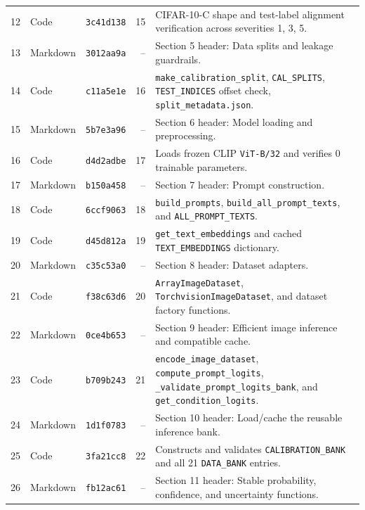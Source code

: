 \documentclass[11pt,a4paper]{article}
\begin{document}
\begin{small}
\begin{longtable}{r l l r L{0.50\textwidth}}
12 & Code & \texttt{3c41d138} & 15 & CIFAR-10-C shape and test-label alignment verification across severities 1, 3, 5. \\
13 & Markdown & \texttt{3012aa9a} & -- & Section 5 header: Data splits and leakage guardrails. \\
14 & Code & \texttt{c11a5e1e} & 16 & \texttt{make\_\allowbreak{}calibration\_\allowbreak{}split}, \texttt{CAL\_\allowbreak{}SPLITS}, \texttt{TEST\_\allowbreak{}INDICES} offset check, \texttt{split\_\allowbreak{}metadata.\allowbreak{}json}. \\
15 & Markdown & \texttt{5b7e3a96} & -- & Section 6 header: Model loading and preprocessing. \\
16 & Code & \texttt{d4d2adbe} & 17 & Loads frozen CLIP \texttt{ViT-B/\allowbreak{}32} and verifies 0 trainable parameters. \\
17 & Markdown & \texttt{b150a458} & -- & Section 7 header: Prompt construction. \\
18 & Code & \texttt{6ccf9063} & 18 & \texttt{build\_\allowbreak{}prompts}, \texttt{build\_\allowbreak{}all\_\allowbreak{}prompt\_\allowbreak{}texts}, and \texttt{ALL\_\allowbreak{}PROMPT\_\allowbreak{}TEXTS}. \\
19 & Code & \texttt{d45d812a} & 19 & \texttt{get\_\allowbreak{}text\_\allowbreak{}embeddings} and cached \texttt{TEXT\_\allowbreak{}EMBEDDINGS} dictionary. \\
20 & Markdown & \texttt{c35c53a0} & -- & Section 8 header: Dataset adapters. \\
21 & Code & \texttt{f38c63d6} & 20 & \texttt{ArrayImageDataset}, \texttt{TorchvisionImageDataset}, and dataset factory functions. \\
22 & Markdown & \texttt{0ce4b653} & -- & Section 9 header: Efficient image inference and compatible cache. \\
23 & Code & \texttt{b709b243} & 21 & \texttt{encode\_\allowbreak{}image\_\allowbreak{}dataset}, \texttt{compute\_\allowbreak{}prompt\_\allowbreak{}logits}, \texttt{\_\allowbreak{}validate\_\allowbreak{}prompt\_\allowbreak{}logits\_\allowbreak{}bank}, and \texttt{get\_\allowbreak{}condition\_\allowbreak{}logits}. \\
24 & Markdown & \texttt{1d1f0783} & -- & Section 10 header: Load/cache the reusable inference bank. \\
25 & Code & \texttt{3fa21cc8} & 22 & Constructs and validates \texttt{CALIBRATION\_\allowbreak{}BANK} and all 21 \texttt{DATA\_\allowbreak{}BANK} entries. \\
26 & Markdown & \texttt{fb12ac61} & -- & Section 11 header: Stable probability, confidence, and uncertainty functions. \\

\end{longtable}
\end{small}
\end{document}
